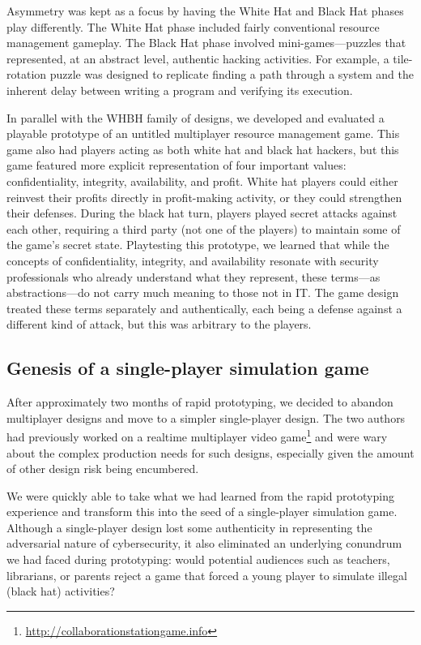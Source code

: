 \documentclass[letterpaper]{article}
\begin{document}
Asymmetry was kept as a focus by having the White Hat and Black Hat
phases play differently. The White Hat phase included fairly conventional
resource management gameplay.
The Black Hat phase involved mini-games---puzzles that represented,
at an abstract level, authentic hacking activities.
For example, a tile-rotation puzzle was designed to replicate
finding a path through a system and the inherent delay between
writing a program and verifying its execution.

In parallel with the WHBH family of designs, we developed and evaluated 
a playable prototype of an untitled multiplayer resource management game.
This game also had players acting as both white hat and black hat hackers,
but this game featured more explicit representation of four
important values: confidentiality, integrity, availability, and profit.
White hat players could either reinvest their profits directly in
profit-making activity, or they could strengthen their defenses.
During the black hat turn, players played secret attacks against 
each other, requiring a third party (not one of the players) to maintain
some of the game's secret state.
Playtesting this prototype, we learned that 
while the concepts of confidentiality, integrity, and availability
resonate with security professionals who already understand what
they represent, these terms---as abstractions---do not carry much meaning
to those not in IT. 
The game design treated these terms separately and authentically,
each being a defense against a different kind of attack,
but this was arbitrary to the players.

\subsection{Genesis of a single-player simulation game}

After approximately two months of rapid prototyping, we decided
to abandon multiplayer designs and move to a simpler single-player
design. The two authors had previously worked on a realtime
multiplayer video 
game\footnote{\url{http://collaborationstationgame.info}} and
were wary about the complex production needs for such designs, especially
given the amount of other design risk being encumbered.

We were quickly able to take what we had learned from the rapid
prototyping experience and transform this into the seed of a single-player
simulation game.
Although a single-player design lost some authenticity in representing
the adversarial nature of cybersecurity, it also eliminated an underlying
conundrum we had faced during prototyping: would potential audiences
such as teachers, librarians, or parents 
reject a game that forced a young
player to simulate illegal (black hat) activities?
\end{document}
